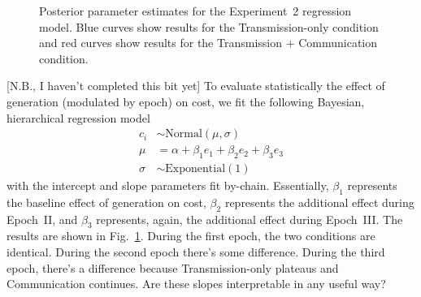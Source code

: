 \documentclass[doc,biblatex]{apa7}
\begin{document}
	\begin{figure}
	\vspace*{2pt}
	\caption{Posterior parameter estimates for the Experiment~2 regression model. Blue curves show results for the Transmission-only condition and red curves show results for the Transmission + Communication condition.}
	\label{posterior_con}
	\end{figure}

[N.B., I haven't completed this bit yet] To evaluate statistically the effect of generation (modulated by epoch) on cost, we fit the following Bayesian, hierarchical regression model
    \begin{align*}
     c_{i} & \sim \mathrm{Normal}(\mu, \sigma) \\
       \mu & = \alpha + \beta_1 e_1 + \beta_2 e_2 + \beta_3 e_3 \\
    \sigma & \sim \mathrm{Exponential}(1)
    \end{align*}
with the intercept and slope parameters fit by-chain. Essentially, $\beta_1$ represents the baseline effect of generation on cost, $\beta_2$ represents the additional effect during Epoch~II, and $\beta_3$ represents, again, the additional effect during Epoch~III. The results are shown in Fig.~\ref{posterior_con}. During the first epoch, the two conditions are identical. During the second epoch there's some difference. During the third epoch, there's a difference because Transmission-only plateaus and Communication continues. Are these slopes interpretable in any useful way?
\end{document}
